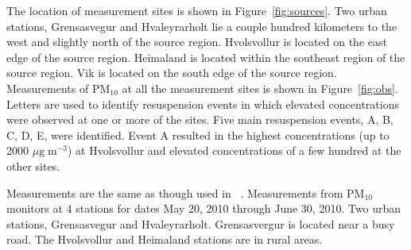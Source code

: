 

The location of measurement sites is shown in Figure~\ref{fig:sources}.
Two urban stations, Grensasvegur and Hvaleyrarholt lie a couple hundred kilometers to the west and slightly north of the
source region. 
Hvolsvollur is located on the east edge of the source region. Heimaland is located within the southeast region of the source region.
Vik is located on the south edge of the source region.
Measurements of PM$_{10}$ at all the measurement sites is shown in Figure~\ref{fig:obs}. 
Letters are used to identify resuspension events in which elevated concentrations were observed at one or more of the sites. 
Five main resuspension events, A, B, C, D, E, were identified.
Event A resulted in the highest concentrations (up to 2000 $\mu \mathrm{g} \; \mathrm{m}^{-3}$) at Hvolsvollur and elevated concentrations of
a few hundred \ugm at the other sites. 

Measurements are the same as though used in ~\cite{Leadbetter12}.
Measurements from PM$_{10}$ monitors at  4 stations for dates May 20, 2010 through June 30, 2010.  
Two urban stations, Grensasvegur and Hvaleyrarholt. Grensasvergur is located near a busy road.
The Hvolsvollur and Heimaland stations are in rural areas.




